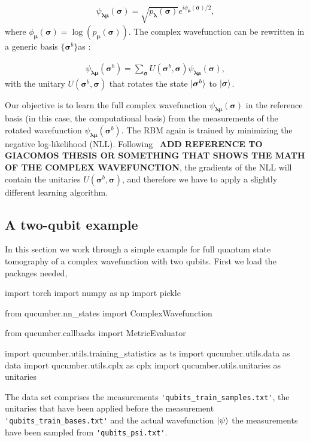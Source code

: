 \documentclass[submission, Phys]{SciPost}
\begin{document}
\begin{align}
	\psi_{\bm{\lambda} \bm{\mu}} (\bm{\sigma})= \sqrt{p_{\bm{\lambda}} (\bm{\sigma})} e^{i \phi_{\bm{\mu}} (\bm{\sigma})/2},
\end{align}
%
where $\phi_{\bm{\mu}}(\bm{\sigma}) = \log (p_{\bm{\mu}} (\bm{\sigma}))$. The complex wavefunction can be rewritten in a generic basis $\{ \bm{\sigma}^b \}$as :

\begin{align}
	\psi_{\bm{\lambda} \bm{\mu}} (\bm{\sigma}^b)= \sum_{\bm{\sigma}} U (\bm{\sigma}^b, \bm{\sigma}) \psi_{\bm{\lambda} \bm{\mu}} (\bm{\sigma}),
\end{align}
%
with the unitary $U (\bm{\sigma}^b, \bm{\sigma})$ that rotates the state $\ket{\bm{\sigma}^b}$ to $\ket{\bm{\sigma}}$.

Our objective is to learn the full complex wavefunction $\psi_{\bm{\lambda} \bm{\mu}} (\bm{\sigma})$ in the reference basis (in this case, the computational basis) from the measurements of the rotated wavefunction $\psi_{\bm{\lambda} \bm{\mu}} (\bm{\sigma}^b)$.
The RBM again is trained by minimizing the negative log-likelihood (NLL). Following~\cite{} \textbf{ADD REFERENCE TO GIACOMOS THESIS OR SOMETHING THAT SHOWS THE MATH OF THE COMPLEX WAVEFUNCTION}, the gradients of the NLL will contain the unitaries $U (\bm{\sigma}^b, \bm{\sigma})$, and therefore we have to apply a slightly different learning algorithm.


\subsection{A two-qubit example}

In this section we work through a simple example for full quantum state tomography of a complex wavefunction with two qubits. 
First we load the packages needed,

\begin{python}
import torch
import numpy as np
import pickle

from qucumber.nn_states import ComplexWavefunction

from qucumber.callbacks import MetricEvaluator

import qucumber.utils.training_statistics as ts
import qucumber.utils.data as data              
import qucumber.utils.cplx as cplx              
import qucumber.utils.unitaries as unitaries
\end{python}


The data set comprises the measurements \verb|'qubits_train_samples.txt'|, the unitaries that have been applied before the measurement \verb|'qubits_train_bases.txt'| and the actual wavefunction $\ket{\psi}$ the measurements have been sampled from \verb|'qubits_psi.txt'|.
\end{document}

